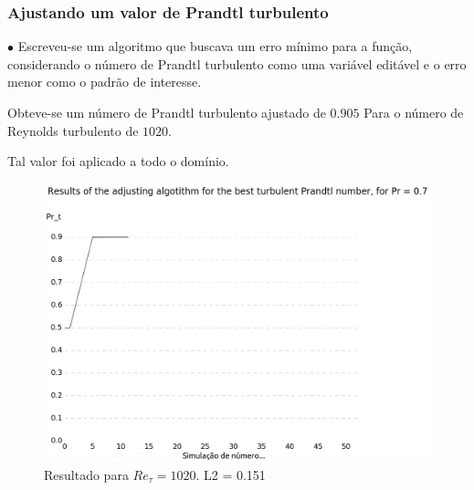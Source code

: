 \documentclass[xcolor=dvipsnames,10pt,aspectratio=169]{beamer}
\begin{document}
	
		\begin{frame}
		\frametitle{Ajustando um valor de Prandtl turbulento}
		\begin{minipage}[h!]{0.45\textwidth}
			$\bullet$ Escreveu-se um algoritmo que buscava um erro mínimo para a função, considerando o número de Prandtl turbulento como uma variável editável e o erro menor como o padrão de interesse. 
			
			Obteve-se um número de Prandtl turbulento ajustado de $ 0.905 $ Para o número de Reynolds turbulento de $1020$.
			
			Tal valor foi aplicado a todo o domínio.
		\end{minipage}
			\begin{minipage}[h!]{0.2\textwidth}
			\end{minipage}
			\begin{minipage}[h!]{0.45\textwidth}
			\begin{figure}
				\centering
				\includegraphics[angle=0, scale=0.32]{oloco}
				\caption{Resultado para $Re_\tau = 1020$. L2 = 0.151}
			\end{figure}
		\end{minipage}	
		\end{frame}
		
		
		
		
		
\end{document}

